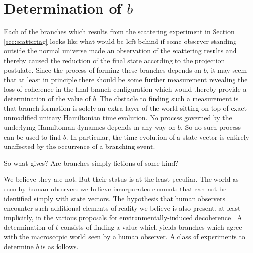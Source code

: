 \documentclass[twocolumn,amsmath,amssymb]{revtex4-1}
\begin{document}
  





\section{\label{sec:bmeasurement} Determination of $b$}



Each of the branches which results from the scattering experiment
in Section \ref{sec:scattering} looks like 
what would be left behind if 
some observer standing outside the
normal universe made an observation of the scattering
results and thereby caused the reduction of
the final state according to the projection postulate.
Since the process of
forming these branches depends on $b$, it may seem that at
least in principle there should be some further measurement
revealing the loss of coherence in the final branch configuration
which would thereby provide a determination of the value of $b$.
The obstacle to finding such a measurement
is that branch formation is solely an extra layer of
the world sitting on top of exact unmodified
unitary Hamiltonian time evolution.
No process governed by the underlying Hamiltonian
dynamics depends in any way on $b$.
So no such process can be used to find $b$.
In particular, the time evolution of a state
vector is entirely unaffected by the occurrence of
a branching event.

So what gives? Are branches simply fictions of some kind?

We believe they are not.  But their status is at the least peculiar.
The world as seen by human observers we believe incorporates elements that
can not be identified simply with state vectors.
The hypothesis that human observers encounter
such additional elements of reality we believe
is also present, at least implicitly, in
the various proposals
for environmentally-induced decoherence \cite{Zeh, Zurek, Zurek1, Zurek2, Wallace, Riedel}.
A determination of $b$ consists of finding a value
which yields branches which agree with
the macroscopic world seen by a human observer.
A class
of experiments
to determine $b$ is as follows.
\end{document}
